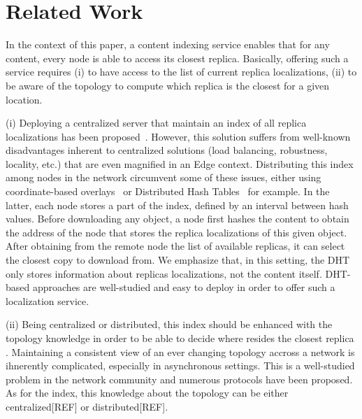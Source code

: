 \section{Related Work}
\label{sec:related_work}


In the context of this paper, a content indexing service enables that for any content, every node is able to access its closest replica.
Basically, offering such a service requires (i) to have access to the list of current replica localizations, (ii) to be aware of the topology to compute which replica is the closest for a given location. 

(i) Deploying a centralized server that maintain an index of all replica localizations has been proposed~\cite{fogstore, p2p-alto, p2p-oracle, snamp}. However, this solution suffers from well-known disadvantages inherent to centralized solutions (load balancing, robustness, locality, etc.) that are even magnified in an Edge context.
Distributing this index among nodes in the network circumvent some of these issues, either using coordinate-based overlays~\cite{coin_19, voronet} or Distributed Hash Tables~\cite{squirrel, ipfs, dht-name-resolution, mdht} for example. In the latter, each node stores a part of the index, defined by an interval between hash values. 
Before downloading any object, a node first
hashes the content to obtain the address of the node that stores the replica localizations of this given object. After obtaining from the remote node the list of available replicas, it can select the closest copy to download from. We emphasize that, in this setting, the DHT only stores information about replicas localizations, not the content itself. DHT-based approaches are well-studied and easy to deploy in order to offer such a localization service. 

(ii) Being centralized or distributed, this index should be enhanced with the topology knowledge in order to be able to decide where resides the closest replica . Maintaining a consistent view of an ever changing topology accross a network is ihnerently complicated, especially in asynchronous settings. This is a well-studied problem in the network community and numerous protocols have been proposed. As for the index, this knowledge about the topology can be either centralized[REF] or distributed[REF].


